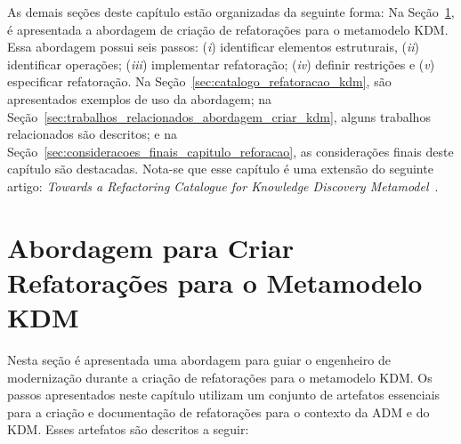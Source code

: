 
As demais seções deste capítulo estão organizadas da seguinte forma: Na Seção~\ref{sec:estrategiasParaAdaptarRefatoracoesParaOMetamodeloKDM}, é apresentada a abordagem de criação de refatorações para o metamodelo KDM. Essa abordagem possui seis passos: (\textit{i}) identificar elementos estruturais, (\textit{ii}) identificar operações; (\textit{iii}) implementar refatoração; (\textit{iv}) definir restrições e (\textit{v}) especificar refatoração. Na Seção~\ref{sec:catalogo_refatoracao_kdm}, são apresentados exemplos de uso da abordagem; na Seção~\ref{sec:trabalhos_relacionados_abordagem_criar_kdm}, alguns trabalhos relacionados são descritos; e na Seção~\ref{sec:consideracoes_finais_capitulo_reforacao}, as considerações finais deste capítulo são destacadas. Nota-se que esse capítulo é uma extensão do seguinte artigo: \textit{Towards a Refactoring Catalogue for Knowledge Discovery Metamodel}~\cite{durelli_catalogo}.


\section{Abordagem para Criar Refatorações para o Metamodelo KDM}\label{sec:estrategiasParaAdaptarRefatoracoesParaOMetamodeloKDM}

Nesta seção é apresentada uma abordagem para guiar o engenheiro de modernização durante a criação de refatorações para o metamodelo KDM. %
Os passos apresentados neste capítulo utilizam um conjunto de artefatos essenciais para a criação e documentação de refatorações para o contexto da ADM e do KDM. Esses artefatos são descritos a seguir:

